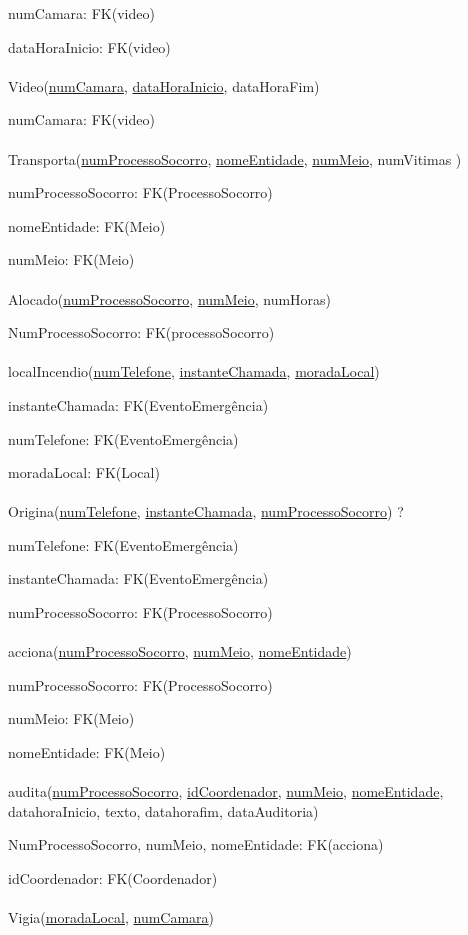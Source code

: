 \documentclass[12pt,a4paper]{article}
\begin{document}
numCamara: FK(video)

dataHoraInicio: FK(video) \\\\
Video(\underline{numCamara}, \underline{dataHoraInicio}, dataHoraFim)

numCamara: FK(video) \\\\
Transporta(\underline{numProcessoSocorro}, \underline{nomeEntidade}, \underline{numMeio}, numVitimas )

numProcessoSocorro: FK(ProcessoSocorro)

nomeEntidade: FK(Meio)

numMeio: FK(Meio) \\\\
Alocado(\underline{numProcessoSocorro}, \underline{numMeio}, numHoras)

NumProcessoSocorro: FK(processoSocorro) \\\\
localIncendio(\underline{numTelefone}, \underline{instanteChamada}, \underline{moradaLocal})

instanteChamada: FK(EventoEmergência)

numTelefone: FK(EventoEmergência)

moradaLocal: FK(Local) \\\\
Origina(\underline{numTelefone}, \underline{instanteChamada}, \underline{numProcessoSocorro})  ?

numTelefone: FK(EventoEmergência)

instanteChamada: FK(EventoEmergência)

numProcessoSocorro: FK(ProcessoSocorro) \\\\
acciona(\underline{numProcessoSocorro}, \underline{numMeio},  \underline{nomeEntidade})

numProcessoSocorro: FK(ProcessoSocorro)

numMeio: FK(Meio)

nomeEntidade: FK(Meio) \\\\
audita(\underline{numProcessoSocorro}, \underline{idCoordenador}, \underline{numMeio}, \underline{nomeEntidade}, datahoraInicio, texto, datahorafim, dataAuditoria)

NumProcessoSocorro, numMeio, nomeEntidade: FK(acciona)

idCoordenador: FK(Coordenador) \\\\
Vigia(\underline{moradaLocal}, \underline{numCamara})
\end{document}
